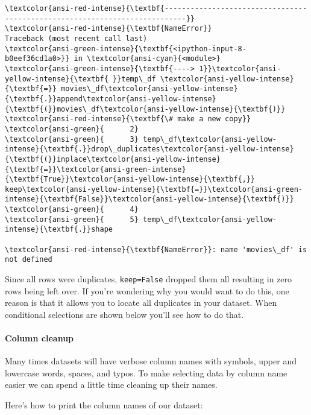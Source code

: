 \documentclass[11pt]{article}
\begin{document}
    \begin{Verbatim}[commandchars=\\\{\}, frame=single, framerule=2mm, rulecolor=\color{outerrorbackground}]
\textcolor{ansi-red-intense}{\textbf{---------------------------------------------------------------------------}}
\textcolor{ansi-red-intense}{\textbf{NameError}}                                 Traceback (most recent call last)
\textcolor{ansi-green-intense}{\textbf{<ipython-input-8-b0eef36cd1a0>}} in \textcolor{ansi-cyan}{<module>}
\textcolor{ansi-green-intense}{\textbf{----> 1}}\textcolor{ansi-yellow-intense}{\textbf{ }}temp\_df \textcolor{ansi-yellow-intense}{\textbf{=}} movies\_df\textcolor{ansi-yellow-intense}{\textbf{.}}append\textcolor{ansi-yellow-intense}{\textbf{(}}movies\_df\textcolor{ansi-yellow-intense}{\textbf{)}}  \textcolor{ansi-red-intense}{\textbf{\# make a new copy}}
\textcolor{ansi-green}{      2} 
\textcolor{ansi-green}{      3} temp\_df\textcolor{ansi-yellow-intense}{\textbf{.}}drop\_duplicates\textcolor{ansi-yellow-intense}{\textbf{(}}inplace\textcolor{ansi-yellow-intense}{\textbf{=}}\textcolor{ansi-green-intense}{\textbf{True}}\textcolor{ansi-yellow-intense}{\textbf{,}} keep\textcolor{ansi-yellow-intense}{\textbf{=}}\textcolor{ansi-green-intense}{\textbf{False}}\textcolor{ansi-yellow-intense}{\textbf{)}}
\textcolor{ansi-green}{      4} 
\textcolor{ansi-green}{      5} temp\_df\textcolor{ansi-yellow-intense}{\textbf{.}}shape

\textcolor{ansi-red-intense}{\textbf{NameError}}: name 'movies\_df' is not defined
    \end{Verbatim}

    Since all rows were duplicates, \texttt{keep=False} dropped them all
resulting in zero rows being left over. If you're wondering why you
would want to do this, one reason is that it allows you to locate all
duplicates in your dataset. When conditional selections are shown below
you'll see how to do that.

    \hypertarget{column-cleanup}{%
\paragraph{Column cleanup}\label{column-cleanup}}

Many times datasets will have verbose column names with symbols, upper
and lowercase words, spaces, and typos. To make selecting data by column
name easier we can spend a little time cleaning up their names.

Here's how to print the column names of our dataset:
\end{document}
